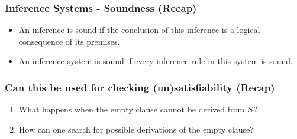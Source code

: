 	   \begin{frame}\frametitle{Inference Systems - Soundness (Recap)}

\begin{itemize}
\item
  \alert{An inference is sound} if 
  the conclusion of this inference is a logical 
  consequence of its premises.

\item
  \alert{An inference system
  is sound} if every inference rule in this system is sound.
\end{itemize}

\bigskip



                           \end{frame}


	   \begin{frame}
\frametitle{Can this be used for checking (un)satisfiability (Recap)}


\begin{enumerate}
  \item What happens when the empty clause \alert{cannot be derived}
  from ${S}$?
  \item \alert{How} can one search for possible derivations of the empty clause?
\end{enumerate}

                           \end{frame}


